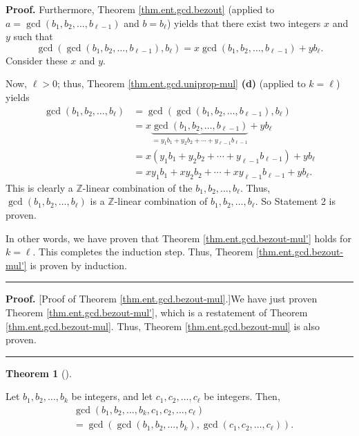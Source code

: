 \documentclass[numbers=enddot,12pt,final,onecolumn,notitlepage]{scrartcl}%
\numberwithin{exer}{subsection}
\theoremstyle{definition}
\newtheorem{theo}{Theorem}[subsection]
\newenvironment{theorem}[1][]
{\begin{theo}[#1]\begin{leftbar}}
{\end{leftbar}\end{theo}}
\newenvironment{proof}[1][Proof]{\noindent\textbf{#1.} }{\ \rule{0.5em}{0.5em}}
\begin{document}
\begin{proof}
Furthermore, Theorem \ref{thm.ent.gcd.bezout} (applied to $a=\gcd\left(
b_{1},b_{2},\ldots,b_{\ell-1}\right)  $ and $b=b_{\ell}$) yields that there
exist two integers $x$ and $y$ such that%
\[
\gcd\left(  \gcd\left(  b_{1},b_{2},\ldots,b_{\ell-1}\right)  ,b_{\ell
}\right)  =x\gcd\left(  b_{1},b_{2},\ldots,b_{\ell-1}\right)  +yb_{\ell}.
\]
Consider these $x$ and $y$.

Now, $\ell>0$; thus, Theorem \ref{thm.ent.gcd.uniprop-mul} \textbf{(d)}
(applied to $k=\ell$) yields%
\begin{align*}
\gcd\left(  b_{1},b_{2},\ldots,b_{\ell}\right)   &  =\gcd\left(  \gcd\left(
b_{1},b_{2},\ldots,b_{\ell-1}\right)  ,b_{\ell}\right) \\
&  =x\underbrace{\gcd\left(  b_{1},b_{2},\ldots,b_{\ell-1}\right)  }%
_{=y_{1}b_{1}+y_{2}b_{2}+\cdots+y_{\ell-1}b_{\ell-1}}+yb_{\ell}\\
&  =x\left(  y_{1}b_{1}+y_{2}b_{2}+\cdots+y_{\ell-1}b_{\ell-1}\right)
+yb_{\ell}\\
&  =xy_{1}b_{1}+xy_{2}b_{2}+\cdots+xy_{\ell-1}b_{\ell-1}+yb_{\ell}.
\end{align*}
This is clearly a $\mathbb{Z}$-linear combination of the $b_{1},b_{2}%
,\ldots,b_{\ell}$. Thus, $\gcd\left(  b_{1},b_{2},\ldots,b_{\ell}\right)  $ is
a $\mathbb{Z}$-linear combination of $b_{1},b_{2},\ldots,b_{\ell}$. So
Statement 2 is proven.

In other words, we have proven that Theorem \ref{thm.ent.gcd.bezout-mul'}
holds for $k=\ell$. This completes the induction step. Thus, Theorem
\ref{thm.ent.gcd.bezout-mul'} is proven by induction.
\end{proof}

\begin{proof}
[Proof of Theorem \ref{thm.ent.gcd.bezout-mul}.]We have just proven Theorem
\ref{thm.ent.gcd.bezout-mul'}, which is a restatement of Theorem
\ref{thm.ent.gcd.bezout-mul}. Thus, Theorem \ref{thm.ent.gcd.bezout-mul} is
also proven.
\end{proof}

\begin{theorem}
\label{thm.ent.gcd.split}Let $b_{1},b_{2},\ldots,b_{k}$ be integers, and let
$c_{1},c_{2},\ldots,c_{\ell}$ be integers. Then,%
\begin{align*}
&  \gcd\left(  b_{1},b_{2},\ldots,b_{k},c_{1},c_{2},\ldots,c_{\ell}\right) \\
&  =\gcd\left(  \gcd\left(  b_{1},b_{2},\ldots,b_{k}\right)  ,\gcd\left(
c_{1},c_{2},\ldots,c_{\ell}\right)  \right)  .
\end{align*}

\end{theorem}
\end{document}
